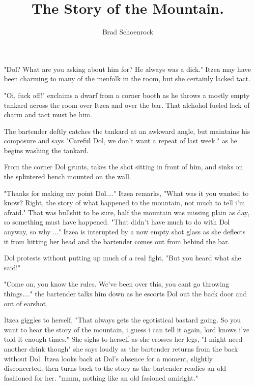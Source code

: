 \documentclass[oneside]{book}
\author{Brad Schoenrock}
\title{The Story of the Mountain.}
\begin{document}
\maketitle

\newpage

\tableofcontents

\newpage

\chapter{}

"Dol? What are you asking about him for? He always was a dick." Itzea may have been charming to many of the menfolk in the room, but she certainly lacked tact. 

"Oi, fuck off!" exclaims a dwarf from a corner booth as he throws a mostly empty tankard across the room over Itzea and over the bar. That alchohol fueled lack of charm and tact must be him. 

The bartender deftly catches the tankard at an awkward angle, but maintains his composure and says "Careful Dol, we don't want a repeat of last week." as he begins washing the tankard. 

From the corner Dol grunts, takes the shot sitting in front of him, and sinks on the splintered bench mounted on the wall. 

"Thanks for making my point Dol...." Itzea remarks, "What was it you wanted to know? Right, the story of what happened to the mountain, not much to tell i'm afraid." That was bullshit to be sure, half the mountain was missing plain as day, so something must have happened. "That didn't have much to do with Dol anyway, so why ..." Itzea is interupted by a now empty shot glass as she deflects it from hitting her head and the bartender comes out from behind the bar. 

Dol protests without putting up much of a real fight, "But you heard what she said!"

"Come on, you know the rules. We've been over this, you cant go throwing things...." the bartender talks him down as he escorts Dol out the back door and out of earshot. 

Itzea giggles to herself, "That always gets the egotistical bastard going. So you want to hear the story of the mountain, i guess i can tell it again, lord knows i've told it enough times." She sighs to herself as she crosses her legs, "I might need another drink though" she says loudly as the bartender returns from the back without Dol. Itzea looks back at Dol's absence for a moment, slightly disconcerted, then turns back to the story as the bartender readies an old fashioned for her. "mmm, nothing like an old fasioned amiright." 
\end{document}
